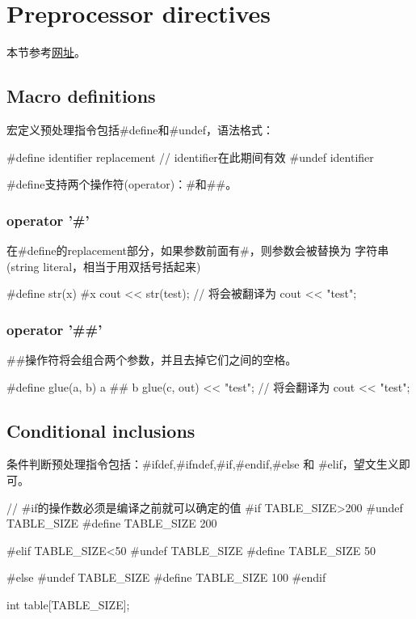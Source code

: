 ﻿\section[Preprocessor directives]{Preprocessor directives}
本节参考\href{http://www.cplusplus.com/doc/tutorial/preprocessor/}{网址}。

\subsection[\#define,\#undef]{Macro definitions}
宏定义预处理指令包括\#define和\#undef，语法格式：

\begin{cppcode}
#define identifier replacement
// identifier在此期间有效
#undef identifier
\end{cppcode}

\#define支持两个操作符(operator)：\#和\#\#。

\subsubsection[operator '\#']{operator '\#'}
在\#define的replacement部分，如果参数前面有\#，则参数会被替换为
字符串(string literal，相当于用双括号括起来)

\begin{cppcode}
#define str(x) #x
cout << str(test);
// 将会被翻译为
cout << "test";
\end{cppcode}

\subsubsection[operator '\#\#']{operator '\#\#'}
\#\#操作符将会组合两个参数，并且去掉它们之间的空格。

\begin{cppcode}
#define glue(a, b) a ## b
glue(c, out) << "test";
// 将会翻译为
cout << "test";
\end{cppcode}

\subsection[\#ifdef,\#ifndef,\#if,\#endif,\#else and \#elif]{Conditional inclusions}
条件判断预处理指令包括：\#ifdef,\#ifndef,\#if,\#endif,\#else 和 \#elif，望文生义即可。

\begin{cppcode}
// #if的操作数必须是编译之前就可以确定的值
#if TABLE_SIZE>200
#undef TABLE_SIZE
#define TABLE_SIZE 200

#elif TABLE_SIZE<50
#undef TABLE_SIZE
#define TABLE_SIZE 50

#else
#undef TABLE_SIZE
#define TABLE_SIZE 100
#endif

int table[TABLE_SIZE];
\end{cppcode}

